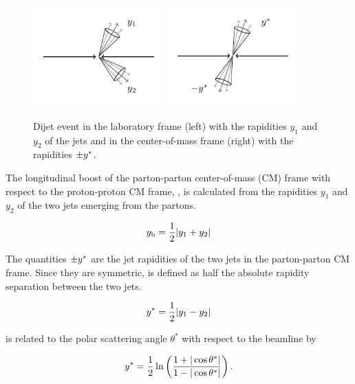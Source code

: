 \begin{figure}[htbp]
    \centering
    \includegraphics[width=0.45\textwidth]{figures/drawings/dijet_lab.pdf}
    \includegraphics[width=0.45\textwidth]{figures/drawings/dijet_cm.pdf}
    \caption[Dijet event in laboratory and center-of-mass frame.]
        {Dijet event in the laboratory frame (left) with the rapidities $y_1$
        and $y_2$ of the jets and in the center-of-mass frame (right) with the
    rapidities $\pm y^*$.}
    \label{fig:dijet_cm_lab_frame}
\end{figure}

The longitudinal boost of the parton-parton center-of-mass (CM) frame with
respect to the proton-proton CM frame, \yboost, is calculated from the
rapidities $y_1$ and $y_2$ of the two jets emerging from the partons. 

\begin{equation*}
    y_{\mathrm{b}} = \frac{1}{2} |y_1 + y_2|
\end{equation*}

The quantities $\pm y^*$ are the jet rapidities of the two jets in the
parton-parton CM frame. Since they are symmetric, \ystar is defined as half the
absolute rapidity separation between the two jets.

\begin{equation*}
    y^* = \frac{1}{2} |y_1 - y_2|
\end{equation*}

\ystar is related to the polar scattering angle $\theta^*$ with respect to the
beamline by 

\begin{equation*}
    y^* = \frac{1}{2} \ln \left( \frac{1 + |\cos \theta^*|}{1- | \cos \theta^*|} \right).
\end{equation*}

